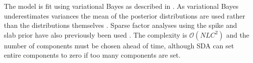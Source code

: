 The model is fit using variational Bayes as described in \parencite{Hore2015Latent, Hore2016Tensor}. As variational Bayes underestimates variances the mean of the posterior distributions are used rather than the distributions themselves \parencite{Jaakkola2000Bayesian}. Sparse factor analyses using the spike and slab prior have also previously been used \parencite{West2003Bayesian, Lucas2006Sparse}. The complexity is $\mathcal{O}(NLC^2)$ and the number of components must be chosen ahead of time, although SDA can set entire components to zero if too many components are set.






